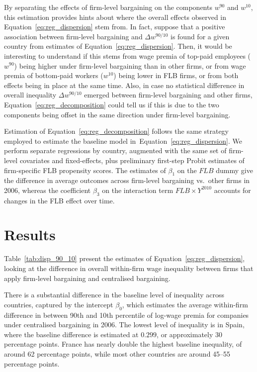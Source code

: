 \documentclass[12pt]{article}
\begin{document}
By separating the effects of firm-level bargaining on the components $w^{90}$ and $w^{10}$, this estimation provides hints about where the overall effects observed in Equation~\eqref{eq:reg_dispersion} stem from. In fact, suppose that a positive association between firm-level bargaining and $\Delta w^{90/10}$ is found for a given country from estimates of Equation~\eqref{eq:reg_dispersion}. Then, it would be interesting to understand if this stems from wage premia of top-paid employees ($w^{90}$) being higher under firm-level bargaining than in other firms, or from wage premia of bottom-paid workers ($w^{10}$) being lower in FLB firms, or from both effects being in place at the same time. Also, in case no statistical difference in overall inequality $\Delta w^{90/10}$ emerged between firm-level bargaining and other firms, Equation~\eqref{eq:reg_decomposition} could tell us if this is due to the two components being offset in the same direction under firm-level bargaining. 

Estimation of Equation~\eqref{eq:reg_decomposition} follows the same strategy employed to estimate the baseline model in~Equation~\eqref{eq:reg_dispersion}. We perform separate regressions by country, augmented with the same set of firm-level covariates and fixed-effects, plus preliminary first-step Probit estimates of firm-specific FLB propensity scores. The estimates of $\beta_1$ on the $\mathit{FLB}$ dummy give the difference in average outcomes across firm-level bargaining vs.~other firms in 2006, whereas the coefficient $\beta_3$ on the interaction term $\mathit{FLB} \times Y^{2010}$ accounts for changes in the FLB effect over time.

\section{Results}
\label{sec:results}

Table~\ref{tab:disp_90_10} present the estimates of Equation~\eqref{eq:reg_dispersion}, looking at the difference in overall within-firm wage inequality between firms that apply firm-level bargaining and centralised bargaining.

There is a substantial difference in the baseline level of inequality across countries, captured by the intercept $\beta_0$, which estimates the average within-firm difference in between 90th and 10th percentile of log-wage premia for companies under centralised bargaining in 2006. The lowest level of inequality is in Spain, where the baseline difference is estimated at $0.299$, or approximately 30 percentage points. France has nearly double the highest baseline inequality, of around 62 percentage points, while most other countries are around 45--55 percentage points.
\end{document}
